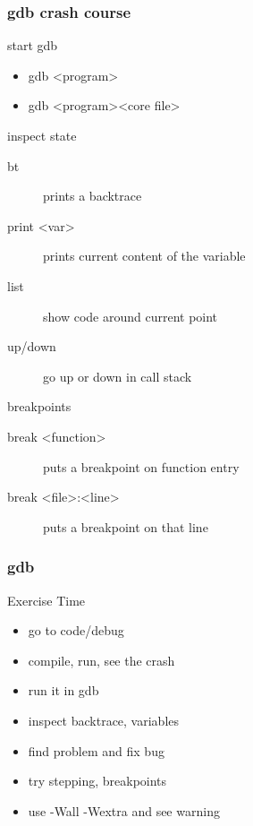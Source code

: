\begin{frame}[fragile]
  \frametitle{gdb crash course}
  \begin{block}{start gdb}
    \begin{itemize}
    \item gdb \textless{}program\textgreater
    \item gdb \textless{}program\textgreater \textless{}core file\textgreater
    \end{itemize}
  \end{block}
  \begin{block}{inspect state}
    \begin{description}
    \item[bt] prints a backtrace
    \item[print \textless{}var\textgreater] prints current content of the variable
    \item[list] show code around current point
    \item[up/down] go up or down in call stack
    \end{description}
  \end{block}
  \begin{block}{breakpoints}
    \begin{description}
    \item[break \textless{}function\textgreater] puts a breakpoint on function entry
    \item[break \textless{}file\textgreater:\textless{}line\textgreater] puts a breakpoint on that line
    \end{description}
  \end{block}
\end{frame}

\begin{frame}[fragile]
  \frametitle{gdb}
  \begin{alertblock}{Exercise Time}
    \begin{itemize}
    \item go to code/debug
    \item compile, run, see the crash
    \item run it in gdb
    \item inspect backtrace, variables
    \item find problem and fix bug
    \item try stepping, breakpoints
    \item use -Wall -Wextra and see warning
    \end{itemize}
  \end{alertblock}
\end{frame}

